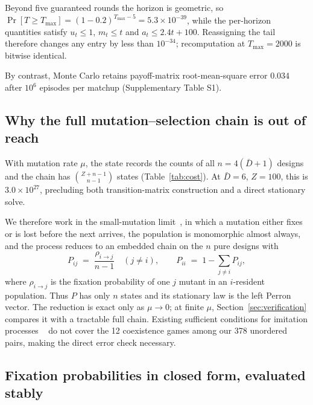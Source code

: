 \documentclass[a4paper,fleqn]{cas-sc}
\begin{document}
Beyond five guaranteed rounds the horizon is geometric, so
$\Pr[T\ge T_{\max}]=(1-0.2)^{T_{\max}-5}=5.3\times10^{-39}$, while the
per-horizon quantities satisfy $u_t\le1$, $m_t\le t$ and
$a_t\le2.4t+100$. Reassigning the tail therefore changes any entry by less than
$10^{-34}$; recomputation at $T_{\max}=2000$ is bitwise identical.

By contrast, Monte Carlo retains payoff-matrix root-mean-square error $0.034$
after $10^6$ episodes per matchup (Supplementary Table S1).

\subsection{Why the full mutation--selection chain is out of reach}
\label{sec:reduction}

With mutation rate $\mu$, the state records the counts of all
$n=4(\bar D+1)$ designs and the chain has $\binom{Z+n-1}{n-1}$ states
(Table~\ref{tab:cost}). At $\bar D=6$, $Z=100$, this is
$3.0\times10^{27}$, precluding both transition-matrix construction and a direct
stationary solve.



We therefore work in the small-mutation
limit~\citep{fudenberg2006imitation,nowak2004emergence}, in which a mutation
either fixes or is lost before the next arrives, the population is monomorphic
almost always, and the process reduces to an embedded chain on the $n$ pure
designs with
\begin{equation}
  P_{ij} \;=\; \frac{\rho_{i\to j}}{n-1} \quad (j\ne i),
  \qquad
  P_{ii} \;=\; 1-\sum_{j\ne i}P_{ij},
  \label{eq:embedded}
\end{equation}
where $\rho_{i\to j}$ is the fixation probability of one $j$ mutant in an
$i$-resident population. Thus $P$ has only $n$ states and its stationary law is
the left Perron vector. The reduction is exact only as $\mu\to0$; at finite
$\mu$, Section~\ref{sec:verification} compares it with a tractable full chain.
Existing sufficient conditions for imitation processes
~\citep{wu2012howsmall} do not cover the 12 coexistence games among our 378
unordered pairs, making the direct error check necessary.

\subsection{Fixation probabilities in closed form, evaluated stably}
\label{sec:fixation}
\end{document}
